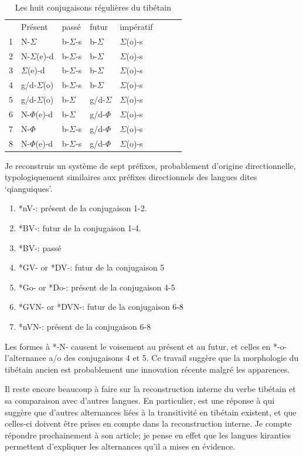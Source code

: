 \documentclass[oldfontcommands,oneside,a4paper,11pt]{memoir}
\newcommand{\sig}{\begin{math}\Sigma\end{math}}
\newcommand{\phone}{\begin{math}\Phi\end{math}}
\begin{document}
\begin{table}[H]
\caption{Les huit conjugaisons régulières du tibétain } 
\begin{tabular}{llllllll} 
 	&	Présent	&	passé	&	futur	&	impératif	\\
1	&	N-\sig{}	&	b-\sig{}-s	&	b-\sig{}	&	\sig{}(o)-s	\\
2	&	N-\sig{}(e)-d	&	b-\sig{}-s	&	b-\sig{}	&	\sig{}(o)-s	\\
3	&	\sig{}(e)-d	&	b-\sig{}-s	&	b-\sig{}	&	\sig{}(o)-s	\\
4	&	g/d-\sig{}(o)	&	b-\sig{}-s	&	b-\sig{}	&	\sig{}(o)-s	\\
5	&	g/d-\sig{}(o)	&	b-\sig{}	&	g/d-\sig{}	&	\sig{}(o)-s	\\
6	&	N-\phone(e)-d	&	b-\sig{}	&	g/d-\phone{}	&	\sig{}(o)-s	\\
7	&	N-\phone	&	b-\sig{}-s	&	g/d-\phone{}	&	\sig{}(o)-s	\\
8	&	N-\phone(e)-d	&	b-\sig{}-s	&	g/d-\phone{}	&	\sig{}(o)-s	\\
\end{tabular}
\end{table}

Je reconstruis un système de sept préfixes, probablement d'origine directionnelle, typologiquement similaires aux préfixes directionnels des langues dites `qianguiques'.

\begin{enumerate}

\item *nV-: présent de la conjugaison 1-2.
\item *BV-: futur de  la   conjugaison 1-4.
\item *BV-: passé
\item *GV- or *DV-: futur de  la   conjugaison 5
\item *Go- or *Do-: présent de la conjugaison 4-5
\item *GVN- or *DVN-: futur de  la   conjugaison 6-8
\item *nVN-:  présent de la conjugaison 6-8
\end{enumerate}
Les formes à *-N- causent le voisement au présent et au futur, et celles en *-o- l'alternance a/o des conjugaisons 4 et 5. Ce travail suggère que la morphologie du tibétain ancien est probablement une innovation récente malgré les apparences. 

Il reste encore beaucoup à faire sur la reconstruction interne du verbe tibétain et sa comparaison avec d'autres langues. En particulier,  \citet{hill14voicing} est une réponse à \citet{jacques12internal} qui suggère que d'autres alternances liées à la transitivité en tibétain existent, et que celles-ci doivent être prises en compte dans la reconstruction interne.  Je compte répondre prochainement à son article; je pense en effet que les langues kiranties permettent d'expliquer les alternances qu'il  a mises en évidence.
\end{document}
